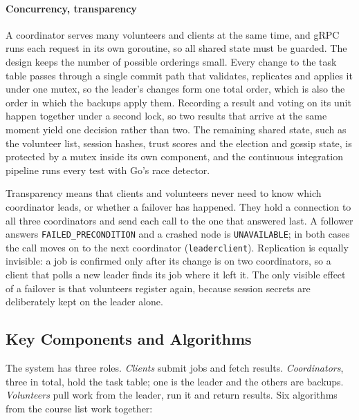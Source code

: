 \paragraph{Concurrency, transparency}
A coordinator serves many volunteers and clients at the same time, and gRPC runs each request in its own goroutine, so all shared state must be guarded. The design keeps the number of possible orderings small. Every change to the task table passes through a single commit path that validates, replicates and applies it under one mutex, so the leader's changes form one total order, which is also the order in which the backups apply them. Recording a result and voting on its unit happen together under a second lock, so two results that arrive at the same moment yield one decision rather than two. The remaining shared state, such as the volunteer list, session hashes, trust scores and the election and gossip state, is protected by a mutex inside its own component, and the continuous integration pipeline runs every test with Go's race detector.

Transparency means that clients and volunteers never need to know which coordinator leads, or whether a failover has happened. They hold a connection to all three coordinators and send each call to the one that answered last. A follower answers \texttt{FAILED\_PRECONDITION} and a crashed node is \texttt{UNAVAILABLE}; in both cases the call moves on to the next coordinator (\texttt{leaderclient}). Replication is equally invisible: a job is confirmed only after its change is on two coordinators, so a client that polls a new leader finds its job where it left it. The only visible effect of a failover is that volunteers register again, because session secrets are deliberately kept on the leader alone.

\subsection{Key Components and Algorithms}
\label{sec:algorithms}

The system has three roles. \emph{Clients} submit jobs and fetch results. \emph{Coordinators}, three in total, hold the task table; one is the leader and the others are backups. \emph{Volunteers} pull work from the leader, run it and return results. Six algorithms from the course list work together:

